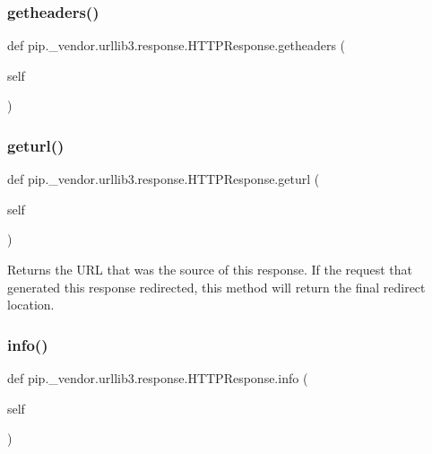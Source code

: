 \subsubsection{\texorpdfstring{getheaders()}{getheaders()}}
{\footnotesize\ttfamily def pip.\+\_\+vendor.\+urllib3.\+response.\+H\+T\+T\+P\+Response.\+getheaders (\begin{DoxyParamCaption}\item[{}]{self }\end{DoxyParamCaption})}

\mbox{\label{classpip_1_1__vendor_1_1urllib3_1_1response_1_1HTTPResponse_aed23b91f07609d31e43919710fa13e5b}} 
\subsubsection{\texorpdfstring{geturl()}{geturl()}}
{\footnotesize\ttfamily def pip.\+\_\+vendor.\+urllib3.\+response.\+H\+T\+T\+P\+Response.\+geturl (\begin{DoxyParamCaption}\item[{}]{self }\end{DoxyParamCaption})}

\begin{DoxyVerb}Returns the URL that was the source of this response.
If the request that generated this response redirected, this method
will return the final redirect location.
\end{DoxyVerb}
 \mbox{\label{classpip_1_1__vendor_1_1urllib3_1_1response_1_1HTTPResponse_a97d4f566d75515e4ba549aca353b3570}} 
\subsubsection{\texorpdfstring{info()}{info()}}
{\footnotesize\ttfamily def pip.\+\_\+vendor.\+urllib3.\+response.\+H\+T\+T\+P\+Response.\+info (\begin{DoxyParamCaption}\item[{}]{self }\end{DoxyParamCaption})}

